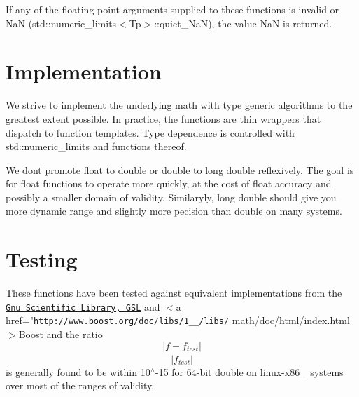If any of the floating point arguments supplied to these functions is invalid or NaN (std\+::numeric\+\_\+limits$<$\+Tp$>$\+::quiet\+\_\+\+NaN), the value NaN is returned.\hypertarget{index_impl}{}\section{Implementation}\label{index_impl}
We strive to implement the underlying math with type generic algorithms to the greatest extent possible. In practice, the functions are thin wrappers that dispatch to function templates. Type dependence is controlled with std\+::numeric\+\_\+limits and functions thereof.

We don\textquotesingle{}t promote {\ttfamily float} to {\ttfamily double} or {\ttfamily double} to {\ttfamily long double} reflexively. The goal is for {\ttfamily float} functions to operate more quickly, at the cost of {\ttfamily float} accuracy and possibly a smaller domain of validity. Similaryly, {\ttfamily long double} should give you more dynamic range and slightly more pecision than {\ttfamily double} on many systems.\hypertarget{index_testing}{}\section{Testing}\label{index_testing}
These functions have been tested against equivalent implementations from the \href{http://www.gnu.org/software/gsl}{\tt Gnu Scientific Library, G\+SL} and $<$a href="\href{http://www.boost.org/doc/libs/1_60_0/libs/}{\tt http\+://www.\+boost.\+org/doc/libs/1\+\_\+\_/libs/} math/doc/html/index.\+html$>$Boost and the ratio \[ \frac{|f - f_{test}|}{|f_{test}|} \] is generally found to be within 10$^\wedge$-\/15 for 64-\/bit double on linux-\/x86\+\_ systems over most of the ranges of validity.


